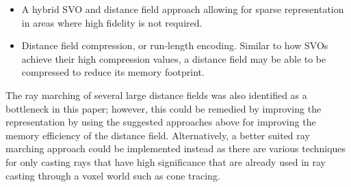 \begin{itemize}
      \item A hybrid SVO and distance field approach allowing for sparse representation in areas where high fidelity is
            not required.
      \item Distance field compression, or run-length encoding. Similar to how SVOs achieve their high compression values,
            a distance field may be able to be compressed to reduce its memory footprint.
\end{itemize}

The ray marching of several large distance fields was also identified as a bottleneck in this paper; however, this could
be remedied by improving the representation by using the suggested approaches above for improving the memory efficiency
of the distance field. Alternatively, a better suited ray marching approach could be implemented instead as there are
various techniques for only casting rays that have high significance that are already used in ray casting through a
voxel world such as cone tracing.
